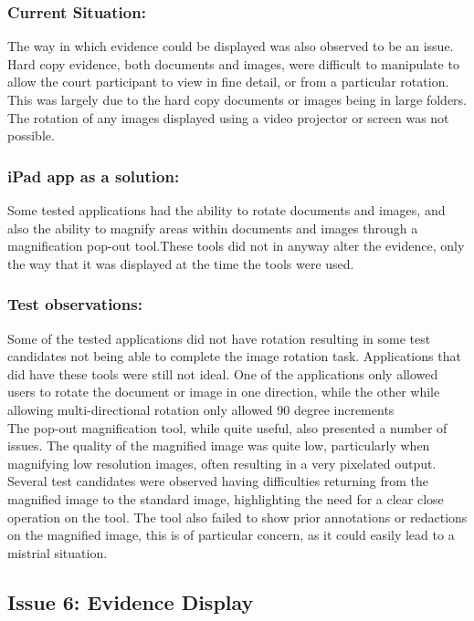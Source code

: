 \documentclass{article}
\begin{document}
\subsubsection{Current Situation:}
The way in which evidence could be displayed was also observed to be an issue. Hard copy evidence, both documents and images, were difficult to manipulate to allow the court participant to view in fine detail, or from a particular rotation. This was largely due to the hard copy documents or images being in large folders. The rotation of any images displayed using a video projector or screen was not possible.\\
\subsubsection{iPad app as a solution:}
Some tested applications had the ability to rotate documents and images, and also the ability to magnify areas within documents and images through a magnification pop-out tool.These tools did not in anyway alter the evidence, only the way that it was displayed at the time the tools were used.\\
\subsubsection{Test observations:}
Some of the tested applications did not have rotation resulting in some test candidates not being able to complete the image rotation task. Applications that did have these tools were still not ideal. One of the applications only allowed users to rotate the document or image in one direction, while the other while allowing multi-directional rotation only allowed 90 degree increments\\
The pop-out magnification tool, while quite useful, also presented a number of issues. The quality of the magnified image was quite low, particularly when magnifying low resolution images, often resulting in a very pixelated output. Several test candidates were observed having difficulties returning from the magnified image to the standard image, highlighting the need for a clear close operation on the tool. The tool also failed to show prior annotations or redactions on the magnified image, this is of particular concern, as it could easily lead to a mistrial situation.

\subsection{Issue 6: Evidence Display}
\end{document}

